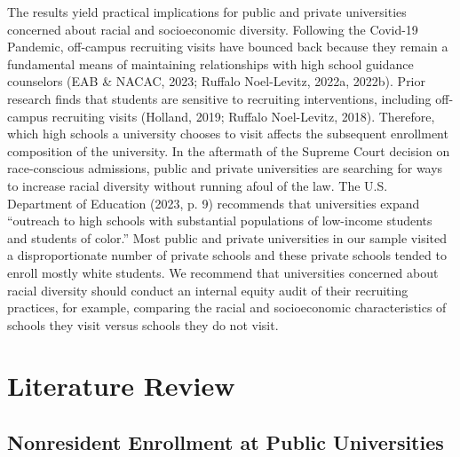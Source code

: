\documentclass[
  12pt,
]{article}
\begin{document}
The results yield practical implications for public and private universities concerned about racial and socioeconomic diversity. Following the Covid-19 Pandemic, off-campus recruiting visits have bounced back because they remain a fundamental means of maintaining relationships with high school guidance counselors (EAB \& NACAC, 2023; Ruffalo Noel-Levitz, 2022a, 2022b). Prior research finds that students are sensitive to recruiting interventions, including off-campus recruiting visits (Holland, 2019; Ruffalo Noel-Levitz, 2018). Therefore, which high schools a university chooses to visit affects the subsequent enrollment composition of the university. In the aftermath of the Supreme Court decision on race-conscious admissions, public and private universities are searching for ways to increase racial diversity without running afoul of the law. The U.S. Department of Education (2023, p. 9) recommends that universities expand ``outreach to high schools with substantial populations of low-income students and students of color.'' Most public and private universities in our sample visited a disproportionate number of private schools and these private schools tended to enroll mostly white students. We recommend that universities concerned about racial diversity should conduct an internal equity audit of their recruiting practices, for example, comparing the racial and socioeconomic characteristics of schools they visit versus schools they do not visit.

\hypertarget{literature-review}{%
\section{Literature Review}\label{literature-review}}

\hypertarget{nonresident-enrollment-at-public-universities}{%
\subsection{Nonresident Enrollment at Public Universities}\label{nonresident-enrollment-at-public-universities}}
\end{document}
